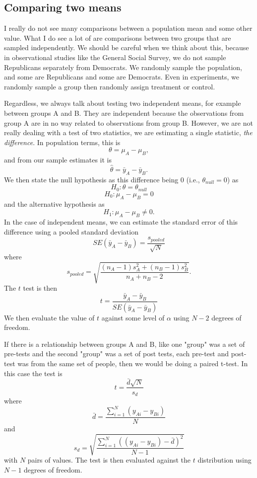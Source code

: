 \subsection{Comparing two means}
\label{sec:pooled}
I really do not see many comparisons between a population mean and some other value. What I do see a lot of are comparisons between two groups that are sampled independently. We should be careful when we think about this, because in observational studies like the General Social Survey, we do not sample Republicans separately from Democrats. We randomly sample the population, and some are Republicans and some are Democrats. Even in experiments, we randomly sample a group then randomly assign treatment or control.

Regardless, we always talk about testing two independent means, for example between groups A and B. They are independent because the observations from group A are in no way related to observations from group B. However, we are not really dealing with a test of two statistics, we are estimating a single statistic, {\it the difference}. In population terms, this is
\[
\theta=\mu_A-\mu_B,
\]
and from our sample estimates it is
\[
\hat{\theta}=\bar{y}_A-\bar{y}_B.
\]
We then state the null hypothesis as this difference being 0 (i.e., $\theta_{null} = 0$) as
\[
H_0:\theta=\theta_{null}
\]
\[
H_0:\mu_A-\mu_B=0
\]
and the alternative hypothesis as
\[
H_1:\mu_A-\mu_B\ne0.
\]
In the case of independent means, we can estimate the standard error of this difference using a pooled standard deviation
\begin{equation}
SE\left(\bar{y}_A-\bar{y}_B\right)=\frac{s_{pooled}}{\sqrt{N}}
\end{equation}
where
\begin{equation}
s_{pooled} = \sqrt{\frac{\left(n_A-1\right)s_A^2+\left(n_B-1\right)s_B^2}{n_A+n_B-2}}.
\end{equation}
The $t$ test is then
\begin{equation}
t = \frac{\bar{y}_A-\bar{y}_B}{SE\left(\bar{y}_A-\bar{y}_B\right)}
\end{equation}
We then evaluate the value of $t$ against some level of $\alpha$ using $N-2$ degrees of freedom.

If there is a relationship between groups A and B, like one "group" was a set of pre-tests and the second "group" was a set of post tests, each pre-test and post-test was from the same set of people, then we would be doing a paired t-test. In this case the test is
\begin{equation}
t=\frac{\bar{d}\sqrt{N}}{s_d}
\end{equation}
where
\begin{equation}
\bar{d} = \frac{\sum_{i=1}^N\left(y_{Ai}-y_{Bi}\right)}{N}
\end{equation}
and
\begin{equation}
s_d = \sqrt{\frac{\sum_{i=1}^N\left(\left(y_{Ai}-y_{Bi}\right)-\bar{d}\right)^2}{N-1}}
\end{equation}
with $N$ pairs of values. The test is then evaluated against the $t$ distribution using $N-1$ degrees of freedom.